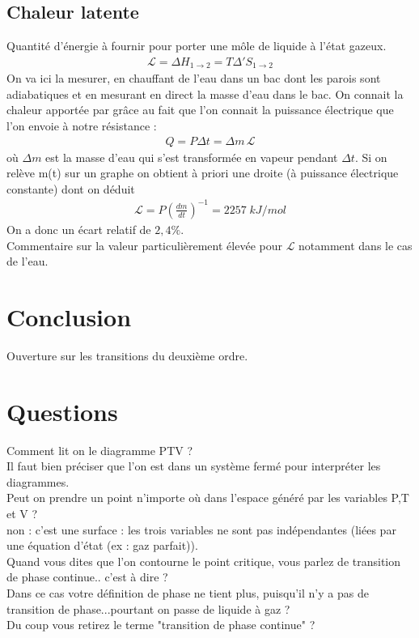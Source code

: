 \documentclass[12pt,prb,aps,epsf]{report}
\begin{document}
\subsection{Chaleur latente}
Quantité d'énergie à fournir pour porter une môle de liquide à l'état gazeux.
\begin{eqnarray}
\mathcal{L} = \Delta H_{1\rightarrow 2} = T\Delta' S_{1\rightarrow 2}
\end{eqnarray}
On va ici la mesurer, en chauffant de l'eau dans un bac dont les parois sont adiabatiques et en mesurant en direct la masse d'eau dans le bac. On connait la chaleur apportée par grâce au fait que l'on connait la puissance électrique que l'on envoie à notre résistance :
\begin{eqnarray}
Q = P\Delta t = \Delta m \,\mathcal{L}
\end{eqnarray}
où $\Delta m$ est la masse d'eau qui s'est transformée en vapeur pendant $\Delta t$. Si on relève m(t) sur un graphe on obtient à priori une droite (à puissance électrique constante) dont on déduit 
\begin{eqnarray}
\mathcal{L} = P \left(\frac{dm}{dt}\right)^{-1} = 2257\;kJ/mol
\end{eqnarray}
On a donc un écart relatif de $2,4\%$.\\
Commentaire sur la valeur particulièrement élevée pour $\mathcal{L}$ notamment dans le cas de l'eau.
\section{Conclusion}
Ouverture sur les transitions du deuxième ordre.

\section*{Questions}
Comment lit on le diagramme PTV ?\\
Il faut bien préciser que l'on est dans un système fermé pour interpréter les diagrammes.\\

Peut on prendre un point n'importe où dans l'espace généré par les variables P,T et V ?\\
non : c'est une surface : les trois variables ne sont pas indépendantes (liées par une équation d'état (ex : gaz parfait)).\\

Quand vous dites que l'on contourne le point critique, vous parlez de transition de phase continue.. c'est à dire ?\\
Dans ce cas votre définition de phase ne tient plus, puisqu'il n'y a pas de transition de phase...pourtant on passe de liquide à gaz ?\\
Du coup vous retirez le terme "transition de phase continue" ?\\
\end{document}
